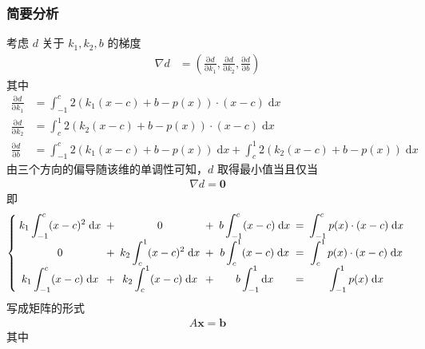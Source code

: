 		\subsubsection{简要分析}
			考虑 $d$ 关于 $k_1,k_2,b$ 的梯度
			\begin{align}
				\nabla d & = \left(\frac{\mathrm{\partial} d}{\mathrm{\partial} k_1},
						\frac{\mathrm{\partial} d}{\mathrm{\partial} k_2},
						\frac{\mathrm{\partial} d}{\mathrm{\partial} b}\right) 
			\end{align}
			其中
			\begin{align}
					\frac{\mathrm{\partial} d}{\mathrm{\partial} k_1} 
						& = \int_{-1}^{c} 2(k_1(x-c)+b-p(x)) \cdot (x-c) \; \mathrm{d}x\\
					\frac{\mathrm{\partial} d}{\mathrm{\partial} k_2} 
						& = \int_{c}^{1} 2(k_2(x-c)+b-p(x)) \cdot (x-c) \; \mathrm{d}x\\
					\frac{\mathrm{\partial} d}{\mathrm{\partial} b} 
						& = \int_{-1}^{c} 2(k_1(x-c)+b-p(x)) \; \mathrm{d}x +
							\int_{c}^{1} 2(k_2(x-c)+b-p(x)) \; \mathrm{d}x 
			\end{align}
			由三个方向的偏导随该维的单调性可知，$d$ 取得最小值当且仅当
			\begin{align}
				\nabla d = \mathbf{0}
			\end{align}
			即
			\begin{align}
				\left\{\setlength{\tabcolsep}{2.5pt}
					\begin{tabular}{cccccccc}
						$\displaystyle k_1 \int_{-1}^{c} (x-c)^2 \; \mathrm{d}x$ & $+$ & $0$ & $+$ & $\displaystyle b \int_{-1}^{c} (x-c) \; \mathrm{d}x $  &$ =$&$\displaystyle  \int_{-1}^{c} p(x)\cdot(x-c) \; \mathrm{d}x$ \\
						$0$ & $+$ & $\displaystyle k_2 \int_{c}^{1} (x-c)^2 \; \mathrm{d}x$ &$ +$&$ \displaystyle b \int_{c}^{1} (x-c) \; \mathrm{d}x $&$  =$ &$ \displaystyle \int_{c}^{1} p(x)\cdot(x-c) \; \mathrm{d}x$ \\
						$k_1 \displaystyle \int_{-1}^{c} (x-c) \; \mathrm{d}x$ & $+$ & $k_2\displaystyle \int_{c}^{1} (x-c) \; \mathrm{d}x$ &$ +$&$ b \displaystyle \int_{-1}^{1} \mathrm{d}x $&$  =$ &$ \displaystyle \int_{-1}^{1} p(x) \; \mathrm{d}x$ 
					\end{tabular}
				\right.
			\end{align}
			写成矩阵的形式
			\begin{align}
				A\mathbf{x} = \mathbf{b}
			\end{align}
			其中
